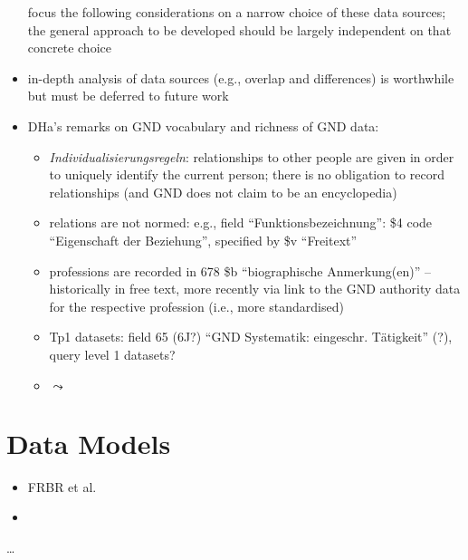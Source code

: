 \begin{itemize}
    focus the following considerations on a narrow choice of these data sources;
    the general approach to be developed should be largely independent on that concrete choice
  \item 
    in-depth analysis of data sources (e.g., overlap and differences) is worthwhile
    but must be deferred to future work
  \item
    DHa's remarks on GND vocabulary and richness of GND data:
    \begin{itemize}
      \item
        \emph{Individualisierungsregeln}: relationships to other people are given in order to uniquely
        identify the current person; there is no obligation to record relationships
        (and GND does not claim to be an encyclopedia)
      \item
        relations are not normed:
        e.g., field \enquote{Funktionsbezeichnung}: \$4 code \enquote{Eigenschaft der Beziehung},
        specified by \$v \enquote{Freitext}
      \item
        professions are recorded in 678 \$b \enquote{biographische Anmerkung(en)} --
        historically in free text,
        more recently via link to the GND authority data for the respective profession (i.e., more standardised)
      \item
        Tp1 datasets: field 65 (6J?) \enquote{GND Systematik: eingeschr. Tätigkeit} (?),
        query level 1 datasets?
      \item
        $\leadsto$ 
    \end{itemize}
\end{itemize}

\section{Data Models}
\label{sec:data_models}

\begin{itemize}
  \item
    FRBR et al.
  \item 
\end{itemize}

\dots

